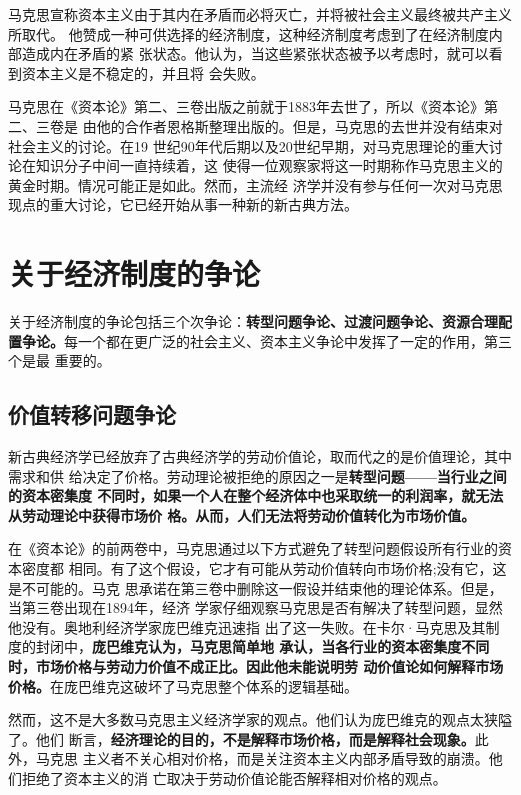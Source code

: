 马克思宣称资本主义由于其内在矛盾而必将灭亡，并将被社会主义最终被共产主义所取代。
他赞成一种可供选择的经济制度，这种经济制度考虑到了在经济制度内部造成内在矛盾的紧
张状态。他认为，当这些紧张状态被予以考虑时，就可以看到资本主义是不稳定的，并且将
会失败。

马克思在《资本论》第二、三卷出版之前就于1883年去世了，所以《资本论》第二、三卷是
由他的合作者恩格斯整理出版的。但是，马克思的去世并没有结束对社会主义的讨论。在19
世纪90年代后期以及20世纪早期，对马克思理论的重大讨论在知识分子中间一直持续着，这
使得一位观察家将这一时期称作马克思主义的黄金时期。情况可能正是如此。然而，主流经
济学并没有参与任何一次对马克思现点的重大讨论，它已经开始从事一种新的新古典方法。

\section{关于经济制度的争论}

关于经济制度的争论包括三个次争论：\textbf{转型问题争论、过渡问题争论、资源合理配
置争论。}每一个都在更广泛的社会主义、资本主义争论中发挥了一定的作用，第三个是最
重要的。

\subsection{价值转移问题争论}

新古典经济学已经放弃了古典经济学的劳动价值论，取而代之的是价值理论，其中需求和供
给决定了价格。劳动理论被拒绝的原因之一是\textbf{转型问题——当行业之间的资本密集度
不同时，如果一个人在整个经济体中也采取统一的利润率，就无法从劳动理论中获得市场价
格。从而，人们无法将劳动价值转化为市场价值。}

在《资本论》的前两卷中，马克思通过以下方式避免了转型问题假设所有行业的资本密度都
相同。有了这个假设，它才有可能从劳动价值转向市场价格;没有它，这是不可能的。马克
思承诺在第三卷中删除这一假设并结束他的理论体系。但是，当第三卷出现在1894年，经济
学家仔细观察马克思是否有解决了转型问题，显然他没有。奥地利经济学家庞巴维克迅速指
出了这一失败。在卡尔·马克思及其制度的封闭中，\textbf{庞巴维克认为，马克思简单地
承认，当各行业的资本密集度不同时，市场价格与劳动力价值不成正比。因此他未能说明劳
动价值论如何解释市场价格。}在庞巴维克这破坏了马克思整个体系的逻辑基础。

然而，这不是大多数马克思主义经济学家的观点。他们认为庞巴维克的观点太狭隘了。他们
断言，\textbf{经济理论的目的，不是解释市场价格，而是解释社会现象。}此外，马克思
主义者不关心相对价格，而是关注资本主义内部矛盾导致的崩溃。他们拒绝了资本主义的消
亡取决于劳动价值论能否解释相对价格的观点。

